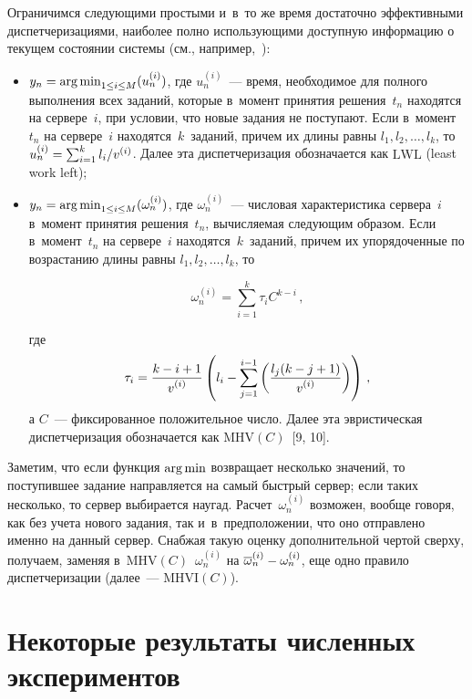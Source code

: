 \begin{multicols}{2}
  
  Ограничимся следующими простыми и~в~то же время достаточно 
эффективными диспетчеризациями, наиболее полно использующими 
доступную информацию о текущем состоянии системы (см., 
например,~\cite[разд.~3]{8-kon}):
  \begin{itemize}
   \item $y_n=\mathop{\mathrm{arg}\,\mathrm{min}}\nolimits_{1\leq i\leq M} (u_n^{(i)})$, где $u_n^{(i)}$~--- время, необходимое для 
полного выполнения всех заданий, которые в~момент принятия решения~$t_n$ находятся на 
сервере~$i$, при условии, что новые задания не поступают. Если в~момент~$t_n$ на сервере~$i$ 
находятся~$k$~заданий, причем их длины равны $l_1, l_2,\ldots , l_k$, то $u_n^{(i)}\hm= 
\sum\nolimits^k_{i=1} l_i/v^{(i)}$. Далее эта диспетчеризация обозначается 
как $\mathrm{LWL}$ (least work left);
  \item $y_n=\mathop{\mathrm{arg}\,\mathrm{min}}\nolimits_{1\leq i\leq M} (\omega_n^{(i)})$, где 
$\omega_n^{(i)}$~--- числовая характеристика сервера~$i$ в~момент принятия 
решения~$t_n$, вычисляемая следующим образом. Если в~момент~$t_n$ на 
сервере~$i$ находятся~$k$~заданий, причем их упорядоченные по 
возрастанию длины равны $l_1, l_2,\ldots , l_k$, то

\noindent
  $$
  \omega_n^{(i)}=\sum\limits^k_{i=1} \tau_i C^{k-i}\,,
  $$
  
  \noindent
где 
$$
\tau_i= \displaystyle\frac{\displaystyle k-i+1\mathstrut}{\displaystyle v^{(i)}\mathstrut} \left( l_i-\sum\limits_{j=1}^{i-1} \left( \displaystyle\frac{\displaystyle l_j(k-
j+1)\mathstrut}{\displaystyle v^{(i)}\mathstrut}\right)\right)\,,
$$
а $C$~--- фиксированное положительное число. Далее эта эвристическая 
диспетчеризация обозначается как $\mathrm{MHV}(C)$~[9, 10].
\end{itemize}
   
   Заметим, что если функция $\mathop{\mathrm{arg}\,\mathrm{min}}$ возвращает несколько значений, то 
поступившее задание направляется на самый быстрый сервер; если таких 
несколько, то сервер выбирается наугад. Расчет~$\omega_n^{(i)}$ возможен, 
вообще говоря, как без учета нового задания, так и~в~предположении, что оно 
отправлено именно на данный сервер. Снабжая такую оценку дополнительной 
чертой сверху, получаем, заменяя в~$\mathrm{MHV}(C)$~$\omega_n^{(i)}$ на 
$\overline{\omega}_n^{(i)} \hm- \omega_n^{(i)}$, еще одно правило 
диспетчеризации (далее~--- $\mathrm{MHVI}(C)$).

\vspace*{-6pt}
   
\section{Некоторые результаты численных экспериментов}


\end{multicols}
